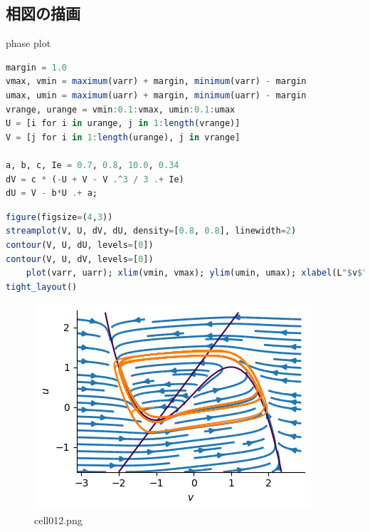 \subsection{相図の描画}
phase plot
\begin{lstlisting}[language=julia]
margin = 1.0
vmax, vmin = maximum(varr) + margin, minimum(varr) - margin
umax, umin = maximum(uarr) + margin, minimum(uarr) - margin
vrange, urange = vmin:0.1:vmax, umin:0.1:umax
U = [i for i in urange, j in 1:length(vrange)]
V = [j for i in 1:length(urange), j in vrange]

a, b, c, Ie = 0.7, 0.8, 10.0, 0.34
dV = c * (-U + V - V .^3 / 3 .+ Ie)
dU = V - b*U .+ a;
\end{lstlisting}
\begin{lstlisting}[language=julia]
figure(figsize=(4,3))
streamplot(V, U, dV, dU, density=[0.8, 0.8], linewidth=2) 
contour(V, U, dU, levels=[0])
contour(V, U, dV, levels=[0])
    plot(varr, uarr); xlim(vmin, vmax); ylim(umin, umax); xlabel(L"$v$"); ylabel(L"$u$")
tight_layout()
\end{lstlisting}
\begin{figure}[ht]
	\centering
	\includegraphics[scale=0.8, max width=\linewidth]{./fig/neuron-model/fhn/cell012.png}
	\caption{cell012.png}
	\label{cell012.png}
\end{figure}
